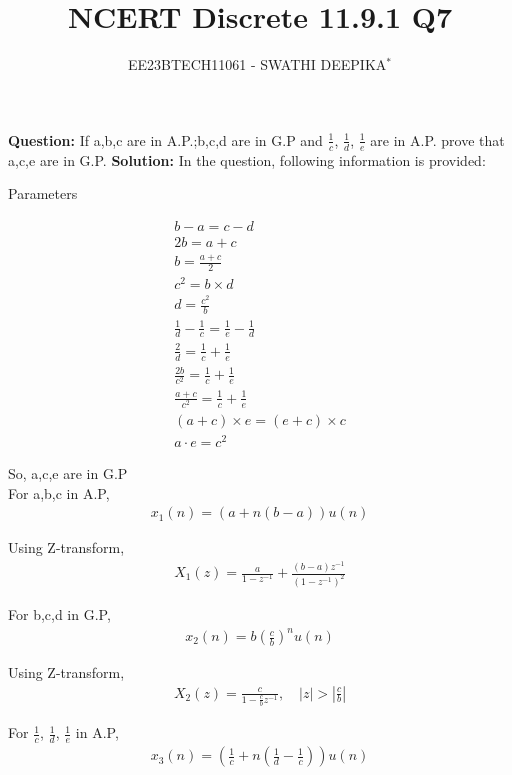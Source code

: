 \documentclass[journal,12pt,twocolumn]{IEEEtran}
\title{
	
\title{NCERT Discrete 11.9.1 Q7}
\author{EE23BTECH11061 - SWATHI DEEPIKA$^{*}$%
}


}
\providecommand{\brak}[1]{\ensuremath{\left(#1\right)}}
\theoremstyle{remark}
\providecommand{\abs}[1]{\left\vert#1\right\vert}
\newcommand{\solution}{\noindent \textbf{Solution: }}
\begin{document}
\maketitle

\textbf{Question:} 
If a,b,c are in A.P.;b,c,d are in G.P and $\frac{1}{c}$, $\frac{1}{d}$, $\frac{1}{e}$ are in A.P. prove that a,c,e are in G.P.
\solution
In the question, following information is provided:
 \begin{table}[h]
 	\centering
 	\resizebox{6 cm}{!}{
 		
 	}
 	\vspace{6 pt}
 	\caption{Parameters}
 	\label{tab:swa_tabel} 
 \end{table}

 
\begin{align}
b-a = c-d\\
2b=a+c\\
b=\frac{a+c}{2}\\
c^2 = b\times d\\
d= \frac{c^2}{b}\\
\frac{1}{d} - \frac{1}{c} = \frac{1}{e} - \frac{1}{d}\\
\frac{2}{d} = \frac{1}{c} + \frac{1}{e}\\
\frac{2b}{c^2} = \frac{1}{c} + \frac{1}{e}\\
\frac{a+c}{c^2} = \frac{1}{c} + \frac{1}{e}\\
(a+c)\times e = (e+c)\times c\\
a \cdot e = c^2
\end{align}

So, a,c,e are in G.P\\


For a,b,c in A.P,
\begin{align}
x_1(n) = (a + n(b-a))u(n)
\end{align}

Using Z-transform, 
\begin{align}
X_1(z) = \frac{a}{1-z^{-1}} + \frac{(b-a)z^{-1}}{(1-z^{-1})^2}
\end{align}

For b,c,d in G.P,
\begin{align}
x_2(n) = b\brak{\frac{c}{b}}^n u(n)
\end{align}

Using Z-transform,
\begin{align}
X_2(z) = \frac{c}{1-\frac{c}{b}z^{-1}},  \quad \abs{z}>\abs{\frac{c}{b}}
\end{align}

For $\frac{1}{c}$, $\frac{1}{d}$, $\frac{1}{e}$ in A.P,
\begin{align}
x_3(n) = \brak{\frac{1}{c} + n\brak{\frac{1}{d} - \frac{1}{c}}}u(n)
\end{align}
\end{document}

